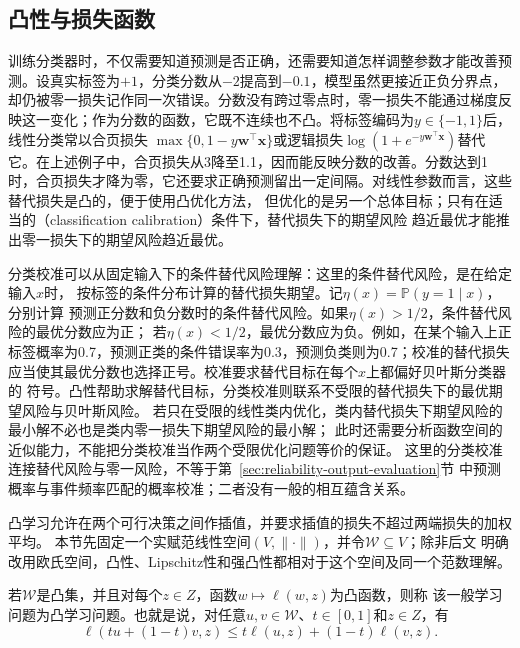 \subsection{凸性与损失函数}

训练分类器时，不仅需要知道预测是否正确，还需要知道怎样调整参数才能改善预测。设真实标签为$+1$，分类分数从$-2$提高到$-0.1$，模型虽然更接近正负分界点，却仍被零一损失记作同一次错误。分数没有跨过零点时，零一损失不能通过梯度反映这一变化；作为分数的函数，它既不连续也不凸。将标签编码为$y\in\{-1,1\}$后，
线性分类常以合页损失
$\max\{0,1-y\bm w^\top\bm x\}$或逻辑损失$\log(1+e^{-y\bm w^\top\bm x})$替代它。在上述例子中，合页损失从3降至1.1，因而能反映分数的改善。分数达到1时，合页损失才降为零，它还要求正确预测留出一定间隔。对线性参数而言，这些替代损失是凸的，便于使用凸优化方法，
但优化的是另一个总体目标；只有在适当的（classification calibration）条件下，替代损失下的期望风险
趋近最优才能推出零一损失下的期望风险趋近最优。

分类校准可以从固定输入下的条件替代风险理解：这里的条件替代风险，是在给定输入$x$时，
按标签的条件分布计算的替代损失期望。记$\eta(x)=\mathbb P(y=1\mid x)$，分别计算
预测正分数和负分数时的条件替代风险。如果$\eta(x)>1/2$，条件替代风险的最优分数应为正；
若$\eta(x)<1/2$，最优分数应为负。例如，在某个输入上正标签概率为0.7，预测正类的条件错误率为0.3，预测负类则为0.7；校准的替代损失应当使其最优分数也选择正号。校准要求替代目标在每个$x$上都偏好贝叶斯分类器的
符号。凸性帮助求解替代目标，分类校准则联系不受限的替代损失下的最优期望风险与贝叶斯风险。
若只在受限的线性类内优化，类内替代损失下期望风险的最小解不必也是类内零一损失下期望风险的最小解；
此时还需要分析函数空间的近似能力，不能把分类校准当作两个受限优化问题等价的保证。
这里的分类校准连接替代风险与零一风险，不等于第~\ref{sec:reliability-output-evaluation}节
中预测概率与事件频率匹配的概率校准；二者没有一般的相互蕴含关系。

凸学习允许在两个可行决策之间作插值，并要求插值的损失不超过两端损失的加权平均。
本节先固定一个实赋范线性空间$(V,\|\cdot\|)$，并令$\mathcal W\subseteq V$；除非后文
明确改用欧氏空间，凸性、Lipschitz性和强凸性都相对于这个空间及同一个范数理解。

\begin{definition}[凸学习问题]
\label{def:convex-learning-problem}
若$\mathcal W$是凸集，并且对每个$z\in Z$，函数$w\mapsto\ell(w,z)$为凸函数，则称
该一般学习问题为凸学习问题。也就是说，对任意$u,v\in\mathcal W$、$t\in[0,1]$和$z\in Z$，有
\[
 \ell(tu+(1-t)v,z)\leq t\ell(u,z)+(1-t)\ell(v,z).
\]
\end{definition}

